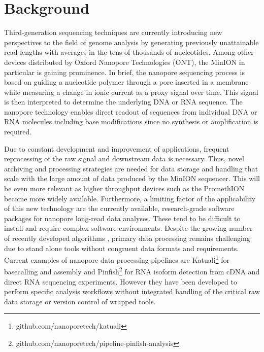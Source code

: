 \section{Background}
\label{sec:nanopype:background}
Third-generation sequencing techniques are currently introducing new perspectives to the field of genome analysis by generating previously unattainable read lengths with averages in the tens of thousands of nucleotides. Among other devices distributed by Oxford Nanopore Technologies (ONT), the MinION in particular is gaining prominence. In brief, the nanopore sequencing process is based on guiding a nucleotide polymer through a pore inserted in a membrane while measuring a change in ionic current as a proxy signal over time. This signal is then interpreted to determine the underlying DNA or RNA sequence. The nanopore technology enables direct readout of sequences from individual DNA or RNA molecules including base modifications since no synthesis or amplification is required.

Due to constant development and improvement of applications, frequent reprocessing of the raw signal and downstream data is necessary. Thus, novel archiving and processing strategies are needed for data storage and handling that scale with the large amount of data produced by the MinION sequencer. This will be even more relevant as higher throughput devices such as the PromethION become more widely available. Furthermore, a limiting factor of the applicability of this new technology are the currently available, research-grade software packages for nanopore long-read data analyses. These tend to be difficult to install and require complex software environments. Despite the growing number of recently developed algorithms \cite{Magi2018}, primary data processing remains challenging due to stand alone tools without congruent data formats and requirements. 
Current examples of nanopore data processing pipelines are Katuali\footnote{github.com/nanoporetech/katuali} for basecalling and assembly and Pinfish\footnote{github.com/nanoporetech/pipeline-pinfish-analysis} for RNA isoform detection from cDNA and direct RNA sequencing experiments. However they have been developed to perform specific analysis workflows without integrated handling of the critical raw data storage or version control of wrapped tools.

